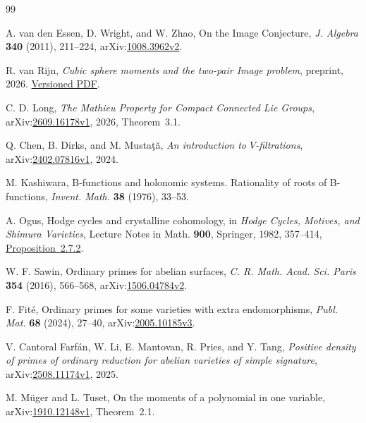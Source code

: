 \documentclass[11pt]{article}
\begin{document}
\begin{thebibliography}{99}

A. van den Essen, D. Wright, and W. Zhao, On the Image Conjecture,
\emph{J. Algebra} \textbf{340} (2011), 211--224,
arXiv:\href{https://arxiv.org/abs/1008.3962v2}{1008.3962v2}.

R. van Rijn, \emph{Cubic sphere moments and the two-pair Image problem},
preprint, 2026.
\href{https://github.com/royvanrijn/jacobian-research/blob/57ca19131af2e3e3c6cea45abae9a94176d610f7/unpublished/cubic-sphere-image/cubic-sphere-image.pdf}{Versioned PDF}.

C. D. Long, \emph{The Mathieu Property for Compact Connected Lie
Groups}, arXiv:\href{https://arxiv.org/abs/2609.16178v1}{2609.16178v1}, 2026,
Theorem~3.1.

Q. Chen, B. Dirks, and M. Musta\c{t}\u{a}, \emph{An introduction to
\(V\)-filtrations}, arXiv:\href{https://arxiv.org/abs/2402.07816v1}{2402.07816v1},
2024.

M. Kashiwara, B-functions and holonomic systems. Rationality of roots of
B-functions, \emph{Invent. Math.} \textbf{38} (1976), 33--53.

A. Ogus, Hodge cycles and crystalline cohomology, in
\emph{Hodge Cycles, Motives, and Shimura Varieties},
Lecture Notes in Math. \textbf{900}, Springer, 1982, 357--414,
\href{https://publications.ias.edu/sites/default/files/Number45.pdf}{Proposition~2.7.2}.

W. F. Sawin, Ordinary primes for abelian surfaces,
\emph{C. R. Math. Acad. Sci. Paris} \textbf{354} (2016), 566--568,
arXiv:\href{https://arxiv.org/abs/1506.04784v2}{1506.04784v2}.

F. Fit\'e, Ordinary primes for some varieties with extra endomorphisms,
\emph{Publ. Mat.} \textbf{68} (2024), 27--40,
arXiv:\href{https://arxiv.org/abs/2005.10185v3}{2005.10185v3}.

V. Cantoral Farf\'an, W. Li, E. Mantovan, R. Pries, and Y. Tang,
\emph{Positive density of primes of ordinary reduction for abelian
varieties of simple signature}, arXiv:\href{https://arxiv.org/abs/2508.11174v1}{2508.11174v1},
2025.

M. M\"uger and L. Tuset, On the moments of a polynomial in one variable,
arXiv:\href{https://arxiv.org/abs/1910.12148v1}{1910.12148v1}, Theorem~2.1.

\end{thebibliography}
\end{document}
